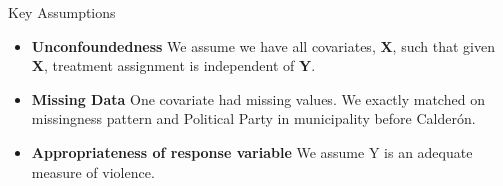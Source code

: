 \documentclass[final]{beamer}
\newlength{\onecolwid}
\begin{document}
\begin{frame}[t]
\begin{columns}[t]
\begin{column}{\onecolwid}
\begin{block}{Key Assumptions}
\begin{itemize}
\begin{itemize}
		\end{itemize}
			\item \textbf{Unconfoundedness} We assume we have all covariates, \textbf{X}, such that given \textbf{X},  treatment assignment is independent of \textbf{Y}.
			\item \textbf{Missing Data} One covariate had missing values. We exactly matched on missingness pattern and Political Party in municipality before Calder\'{o}n.
			\item \textbf{Appropriateness of response variable} We assume Y is an adequate measure of violence.	 %
		\end{itemize}
\end{block}

    \end{column}


\end{columns}
\end{frame}
\end{document}
